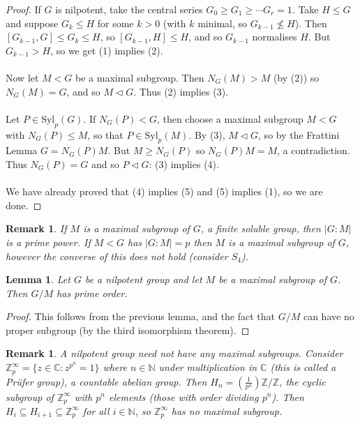 \documentclass[a4paper,10pt]{article}
\newcommand{\CC}{\mathbb{C}}
\newcommand{\NN}{\mathbb{N}}
\newcommand{\ZZ}{\mathbb{Z}}
\newtheorem{Lem}[thm]{Lemma}
\newtheorem{rem}[thm]{Remark}
\begin{document}
\begin{proof}
If $G$ is nilpotent, take the central series $G_0 \geq G_1 \geq \cdots G_r = 1$. Take $H \leq G$ and suppose $G_k \leq H$ for some $k > 0$ (with $k$ minimal, so $G_{k-1} \not\leq H$). Then $[G_{k-1}, G] \leq G_k \leq H$, so $[G_{k-1} , H] \leq H$, and so $G_{k-1}$ normalises $H$. But $G_{k-1} > H$, so we get (1) implies (2). \\
\\
Now let $M < G$ be a maximal subgroup. Then $N_G(M) > M$ (by (2)) so $N_G(M) = G$, and so $M \triangleleft G$. Thus (2) implies (3).\\
\\
Let $P \in \text{Syl}_p(G)$. If $N_G(P) < G$, then choose a maximal subgroup $M < G$ with $N_G(P) \leq M$, so that $P \in \text{Syl}_p(M)$. By (3), $M \triangleleft G$, so by the Frattini Lemma $G = N_G(P) M$. But $M \geq N_G(P)$ so $N_G(P) M = M$, a contradiction. Thus $N_G(P) = G$ and so $P \triangleleft G$: (3) implies (4). \\
\\
We have already proved that (4) implies (5) and (5) implies (1), so we are done.
\end{proof}

\begin{rem}
If $M$ is a maximal subgroup of $G$, a finite soluble group, then $|G : M|$ is a prime power. If $M < G$ has $|G : M| = p$ then $M$ is a maximal subgroup of $G$, however the converse of this does not hold (consider $S_4$).
\end{rem}

\begin{Lem}
Let $G$ be a nilpotent group and let $M$ be a maximal subgroup of $G$. Then $G / M$ has prime order. 
\end{Lem}

\begin{proof}
This follows from the previous lemma, and the fact that $G / M$ can have no proper subgroup (by the third isomorphism theorem).
\end{proof}

\begin{rem}
A nilpotent group need not have any maximal subgroups. Consider $\ZZ_p^\infty = \{ z \in \CC : z^{p^n} = 1 \}$ where $n \in \mathbb{N}$ under multiplication in $\CC$ (this is called a Pr\"{u}fer group), a countable abelian group. Then $H_n = \left( \frac{1}{p^n} \right) \ZZ / \ZZ$, the cyclic subgroup of $\ZZ_p^\infty$ with $p^n$ elements (those with order dividing $p^n$).  Then $H_i \subseteq H_{i+1} \subseteq \ZZ_p^\infty$ for all $i \in \NN$, so $\ZZ_p^\infty$ has no maximal subgroup. 
\end{rem}
\end{document}
